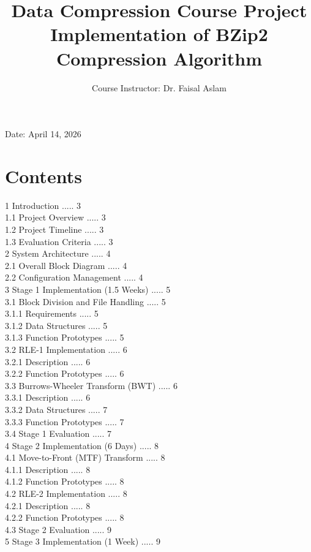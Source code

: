 \documentclass[10pt]{article}
\title{Data Compression Course Project Implementation of BZip2 Compression Algorithm }
\author{Course Instructor: Dr. Faisal Aslam}
\date{}
\begin{document}
\maketitle
\captionsetup{singlelinecheck=false}
Date: April 14, 2026

\section*{Contents}
1 Introduction ..... 3\\
1.1 Project Overview ..... 3\\
1.2 Project Timeline ..... 3\\
1.3 Evaluation Criteria ..... 3\\
2 System Architecture ..... 4\\
2.1 Overall Block Diagram ..... 4\\
2.2 Configuration Management ..... 4\\
3 Stage 1 Implementation (1.5 Weeks) ..... 5\\
3.1 Block Division and File Handling ..... 5\\
3.1.1 Requirements ..... 5\\
3.1.2 Data Structures ..... 5\\
3.1.3 Function Prototypes ..... 5\\
3.2 RLE-1 Implementation ..... 6\\
3.2.1 Description ..... 6\\
3.2.2 Function Prototypes ..... 6\\
3.3 Burrows-Wheeler Transform (BWT) ..... 6\\
3.3.1 Description ..... 6\\
3.3.2 Data Structures ..... 7\\
3.3.3 Function Prototypes ..... 7\\
3.4 Stage 1 Evaluation ..... 7\\
4 Stage 2 Implementation (6 Days) ..... 8\\
4.1 Move-to-Front (MTF) Transform ..... 8\\
4.1.1 Description ..... 8\\
4.1.2 Function Prototypes ..... 8\\
4.2 RLE-2 Implementation ..... 8\\
4.2.1 Description ..... 8\\
4.2.2 Function Prototypes ..... 8\\
4.3 Stage 2 Evaluation ..... 9\\
5 Stage 3 Implementation (1 Week) ..... 9\\
\end{document}

